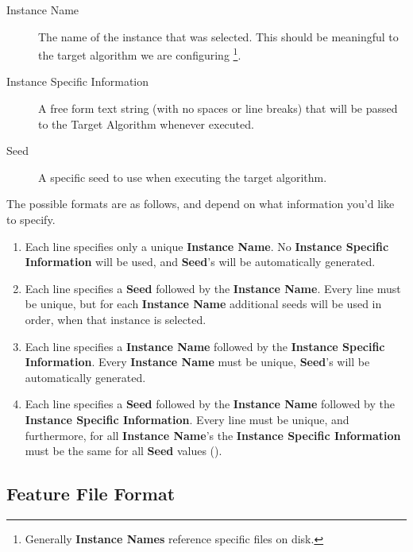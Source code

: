 \documentclass[manual.tex]{subfiles}
\begin{document}
\begin{description}
\item[Instance Name] The name of the instance that was selected. This should be meaningful to the target algorithm we are configuring \footnote{Generally \textbf{Instance Names} reference specific files on disk.}.
\item[Instance Specific Information] A free form text string (with no spaces or line breaks) that will be passed to the Target Algorithm whenever executed.
\item[Seed] A specific seed to use when executing the target algorithm.
\end{description}

The possible formats are as follows, and depend on what information you'd like to specify.

\begin{enumerate}
\item	Each line specifies only a unique \textbf{Instance Name}. No \textbf{Instance Specific Information} will be used, and \textbf{Seed}'s will be automatically generated.

\item  Each line specifies a \textbf{Seed} followed by the \textbf{Instance Name}. Every line must be unique, but for each \textbf{Instance Name} additional seeds will be used in order, when that instance is selected.

\item Each line specifies a \textbf{Instance Name} followed by the \textbf{Instance Specific Information}. Every \textbf{Instance Name} must be unique, \textbf{Seed}'s will be automatically generated.

\item Each line specifies a \textbf{Seed} followed by the \textbf{Instance Name} followed by the \textbf{Instance Specific Information}. Every line must be unique, and furthermore, for all \textbf{Instance Name}'s the \textbf{Instance Specific Information} must be the same for all \textbf{Seed} values ().

\end{enumerate}

\subsection{Feature File Format}\label{sec:feature_file_format}
\end{document}
